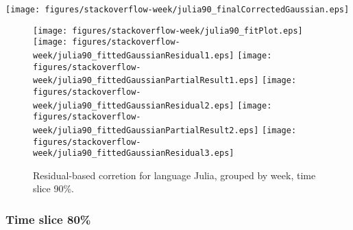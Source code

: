 \begin{center}
{\texttt{[image: figures/stackoverflow-week/julia90\_finalCorrectedGaussian.eps]}}
\end{center}

\FloatBarrier

\begin{figure}[t]
\centering
{}
{\texttt{[image: figures/stackoverflow-week/julia90\_fitPlot.eps]}}
{\texttt{[image: figures/stackoverflow-week/julia90\_fittedGaussianResidual1.eps]}}
{\texttt{[image: figures/stackoverflow-week/julia90\_fittedGaussianPartialResult1.eps]}}
{\texttt{[image: figures/stackoverflow-week/julia90\_fittedGaussianResidual2.eps]}}
{\texttt{[image: figures/stackoverflow-week/julia90\_fittedGaussianPartialResult2.eps]}}
{\texttt{[image: figures/stackoverflow-week/julia90\_fittedGaussianResidual3.eps]}}
\caption{Residual-based corretion for language Julia, grouped by week, time slice 90\%.}
\end{figure}


\FloatBarrier


\subsubsection{Time slice 80\%}

